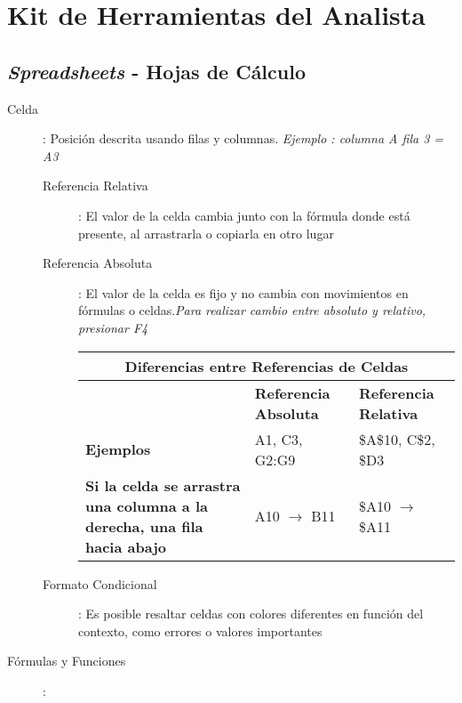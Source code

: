\section {Kit de Herramientas del Analista}

\subsection{\textit{Spreadsheets} - Hojas de Cálculo}
\begin{description}
    \item[Celda]{ : Posición descrita usando filas y columnas. \textit{Ejemplo : columna A fila 3 = A3}
    \begin{description}
        \item[Referencia Relativa]{ : El valor de la celda cambia junto con la fórmula donde está presente, al arrastrarla o copiarla en otro lugar}
        \item[Referencia Absoluta]{ : El valor de la celda es fijo y no cambia con movimientos en fórmulas o celdas.\textit{Para realizar cambio entre absoluto y relativo, presionar F4}}
        \begin{table}
            \centering
            \begin{tabular}{|p{5cm}|p{4.5cm}|p{4.5cm}|}
                \hline
                \multicolumn{3}{|c|}{Diferencias entre Referencias de Celdas} \\
                \hline
                & \textbf{Referencia Absoluta} & \textbf{Referencia Relativa} \\
                \hline
                \textbf{Ejemplos} & A1, C3, G2:G9 & \$A\$10, C\$2, \$D3 \\
                \hline
                \textbf{Si la celda se arrastra una columna a la derecha, una fila hacia abajo} & A10 $\rightarrow$ B11 & \$A10 $\rightarrow$ \$A11 \\
                \hline
            \end{tabular}
        \end{table}
        \item[Formato Condicional]{ : Es posible resaltar celdas con colores diferentes en función del contexto, como errores o valores importantes}
    \end{description}}
    \item[Fórmulas y Funciones]{ : 
    }
\end{description}
